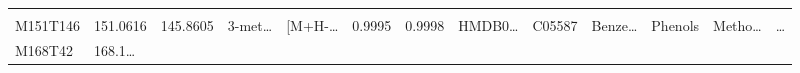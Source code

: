 \documentclass[
]{article}
\begin{document}
\begin{longtable}[]{@{}lllllllllllll@{}}
\begin{minipage}[t]{0.02\columnwidth}
\end{minipage}\tabularnewline
\begin{minipage}[t]{0.05\columnwidth}\raggedright
M151T146\strut
\end{minipage} & \begin{minipage}[t]{0.05\columnwidth}\raggedright
151.0616\strut
\end{minipage} & \begin{minipage}[t]{0.05\columnwidth}\raggedright
145.8605\strut
\end{minipage} & \begin{minipage}[t]{0.05\columnwidth}\raggedright
3-met\ldots{}\strut
\end{minipage} & \begin{minipage}[t]{0.05\columnwidth}\raggedright
{[}M+H-\ldots{}\strut
\end{minipage} & \begin{minipage}[t]{0.07\columnwidth}\raggedright
0.9995\strut
\end{minipage} & \begin{minipage}[t]{0.07\columnwidth}\raggedright
0.9998\strut
\end{minipage} & \begin{minipage}[t]{0.05\columnwidth}\raggedright
HMDB0\ldots{}\strut
\end{minipage} & \begin{minipage}[t]{0.04\columnwidth}\raggedright
C05587\strut
\end{minipage} & \begin{minipage}[t]{0.05\columnwidth}\raggedright
Benze\ldots{}\strut
\end{minipage} & \begin{minipage}[t]{0.05\columnwidth}\raggedright
Phenols\strut
\end{minipage} & \begin{minipage}[t]{0.05\columnwidth}\raggedright
Metho\ldots{}\strut
\end{minipage} & \begin{minipage}[t]{0.02\columnwidth}\raggedright
\ldots{}\strut
\end{minipage}\tabularnewline
\begin{minipage}[t]{0.05\columnwidth}\raggedright
M168T42\strut
\end{minipage} & \begin{minipage}[t]{0.05\columnwidth}\raggedright
168.1\ldots{}\strut
\end{minipage} & \begin{minipage}[t]{0.05\columnwidth}\raggedright

\end{minipage}
\end{longtable}
\end{document}
